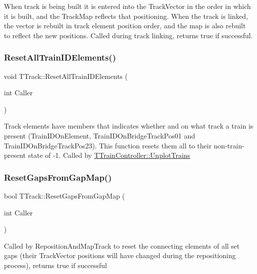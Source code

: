 When track is being built it is entered into the Track\+Vector in the order in which it is built, and the Track\+Map reflects that positioning. When the track is linked, the vector is rebuilt in track element position order, and the map is also rebuilt to reflect the new positions. Called during track linking, returns true if successful. \mbox{\label{class_t_track_a9430d0a48a27e59f41015c5812aa5de2}} 
\subsubsection{\texorpdfstring{Reset\+All\+Train\+I\+D\+Elements()}{ResetAllTrainIDElements()}}
{\footnotesize\ttfamily void T\+Track\+::\+Reset\+All\+Train\+I\+D\+Elements (\begin{DoxyParamCaption}\item[{int}]{Caller }\end{DoxyParamCaption})}

Track elements have members that indicates whether and on what track a train is present (Train\+I\+D\+On\+Element, Train\+I\+D\+On\+Bridge\+Track\+Pos01 and Train\+I\+D\+On\+Bridge\+Track\+Pos23). This function resets them all to their non-\/train-\/present state of -\/1. Called by \mbox{\hyperlink{class_t_train_controller_a7e2abfcc38e51933883d959c4155aca0}{T\+Train\+Controller\+::\+Unplot\+Trains}} \mbox{\label{class_t_track_a1be0a43c6b1dc736d981fe7d883d7f01}} 
\subsubsection{\texorpdfstring{Reset\+Gaps\+From\+Gap\+Map()}{ResetGapsFromGapMap()}}
{\footnotesize\ttfamily bool T\+Track\+::\+Reset\+Gaps\+From\+Gap\+Map (\begin{DoxyParamCaption}\item[{int}]{Caller }\end{DoxyParamCaption})}

Called by Reposition\+And\+Map\+Track to reset the connecting elements of all set gaps (their Track\+Vector positions will have changed during the repositioning process), returns true if successful \mbox{\label{class_t_track_a10027e5b78eb6dfdc246613d78aab53e}} 
